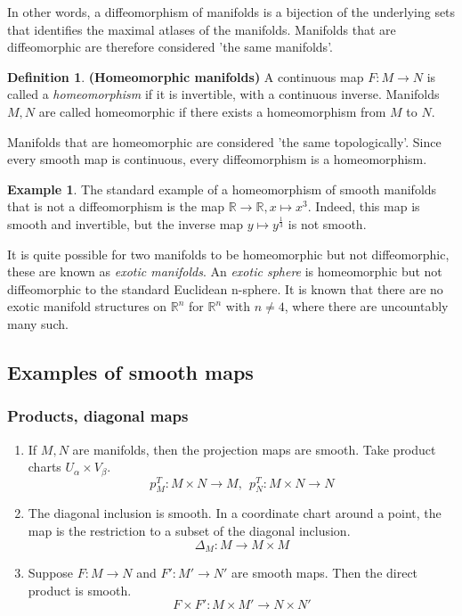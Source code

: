 \documentclass{article}
\theoremstyle{definition}
\newtheorem{defn}[theorem]{Definition}
\newtheorem{example}[theorem]{Example}
\newenvironment{definition}
  {\vspace{8pt}\begin{mdframed}[backgroundcolor=blueish]\begin{defn}}
  {\end{defn}\end{mdframed}\vspace{4pt}}
\begin{document}
In other words, a diffeomorphism of manifolds is a bijection of the underlying sets that identifies the maximal atlases of the manifolds. Manifolds that are diffeomorphic are therefore considered 'the same manifolds'.

\begin{definition} \textbf{(Homeomorphic manifolds)}
A continuous map $F : M \rightarrow N$ is called a \textit{homeomorphism} if it is invertible, with a continuous inverse.  Manifolds $M,N$ are called homeomorphic if there exists a homeomorphism from $M$ to $N$.
\end{definition}

Manifolds that are homeomorphic are considered 'the same topologically'. Since every smooth map is continuous, every diffeomorphism is a homeomorphism.

\begin{example}
The standard example of a homeomorphism of smooth manifolds that is not a diffeomorphism is the map $\mathbb R \rightarrow \mathbb R, x \mapsto x^3$. Indeed, this map is smooth and invertible, but the inverse map $y \mapsto y ^{\frac{1}{3}}$ is not smooth.
\end{example}

It is quite possible for two manifolds to be homeomorphic but not diffeomorphic, these are known as \textit{exotic manifolds}. An \textit{exotic sphere} is homeomorphic but not diffeomorphic to the standard Euclidean n-sphere. It is known that there are no exotic manifold structures on $\mathbb R^n$ for $\mathbb R^n$ with $n \neq 4$, where there are uncountably many such.

\subsection{Examples of smooth maps}

\subsubsection{Products, diagonal maps}
\begin{enumerate}
    \item  If $M,N$ are manifolds, then the projection maps are smooth. Take product charts  $U_\alpha \times V_\beta$.
    \[
        p^{T}_M : M \times N  \rightarrow M, \ \
        p^{T}_N :  M \times N \rightarrow N
    \]
    
    \item The diagonal inclusion is smooth. In a coordinate chart around a point, the map is the restriction to a subset of the diagonal inclusion.
    \[
        \Delta_M : M \rightarrow  M \times M
    \]
    
    \item  Suppose $F : M \rightarrow N$ and $F' : M' \rightarrow N'$ are smooth maps. Then the direct product is smooth.
    \[
        F \times F' : M \times M' \rightarrow N \times N'
    \]
    
\end{enumerate}
\end{document}
